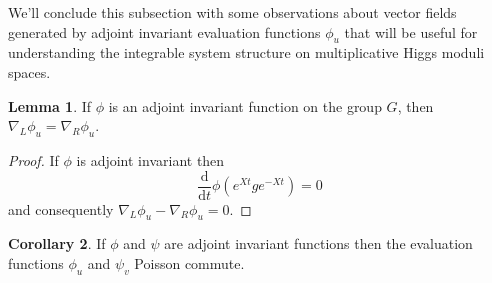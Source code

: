 \documentclass[11pt, oneside, reqno]{amsart}
\theoremstyle{definition} \newtheorem{definition}{Definition}[section]
\newtheorem{lemma}[definition]{Lemma}
\newtheorem{corollary}[definition]{Corollary}
\theoremstyle{definition} \newtheorem{remark}[definition]{Remark}
\theoremstyle{definition} \newtheorem{remarks}[definition]{Remarks}
\theoremstyle{definition} \newtheorem{question}[definition]{Question}
\theoremstyle{definition} \newtheorem*{note}{Note}
\theoremstyle{definition} \newtheorem{example}[definition]{Example}
\theoremstyle{definition} \newtheorem{examples}[definition]{Examples}
\renewcommand{\gg}{\mathfrak{g}}
\newcommand{\bb}[1]{\mathbb{#1}}
\newcommand{\CC}{\mathbb{C}}
\renewcommand{\d}{\mathrm{d}}
\newcommand{\chris}[1]{(\textcolor{red}{Chris: #1})}
\begin{document}



We'll conclude this subsection with some observations about vector fields generated by adjoint invariant evaluation functions $\phi_u$ that will be useful for understanding the integrable system structure on multiplicative Higgs moduli spaces. 
\begin{lemma}
 If $\phi$ is an adjoint invariant function on the group $G$, then
$\nabla_{L} \phi_u  = \nabla_{R} \phi_u$. 
\end{lemma}

\begin{proof}
  If $\phi$ is adjoint invariant then
  \[
    \frac{\d}{\d t} \phi(e^{Xt} g e^{-Xt}) = 0
  \]
  and consequently $\nabla_{L} \phi_u - \nabla_{R} \phi_u  = 0$. 
\end{proof}

\begin{corollary}\label{cor:poisson-commuting}
  If $\phi$ and $\psi$ are adjoint invariant functions then the evaluation functions $\phi_u$ and $\psi_v$ Poisson commute.
\end{corollary}
\end{document}
